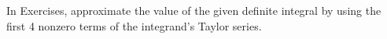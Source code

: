 \begin{exerciseset}{In Exercises}{, approximate the value of the given definite integral by using the first 4 nonzero terms of the integrand's Taylor series.}



\end{exerciseset}
